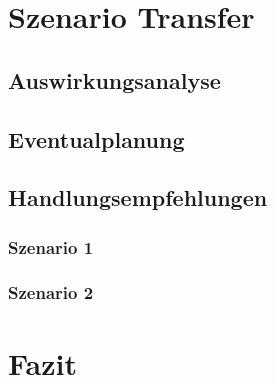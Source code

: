 \chapter{Szenario Transfer}
    \section{Auswirkungsanalyse}
    \section{Eventualplanung}
    \section{Handlungsempfehlungen}
        \subsection{Szenario 1}
        \subsection{Szenario 2}

\chapter{Fazit}
